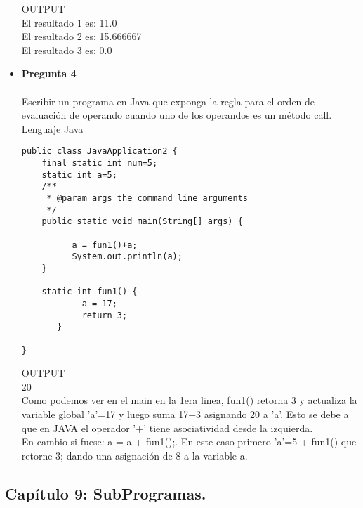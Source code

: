 \documentclass[12pt,oneside]{article}
\begin{document}
\begin{itemize}
OUTPUT\\
El resultado 1 es: 11.0\\
El resultado 2 es: 15.666667\\
El resultado 3 es: 0.0\\


\item {\bf Pregunta 4} \\\\
Escribir un programa en Java que exponga la regla para el orden de evaluación de operando cuando uno de los operandos es un método call.\\
Lenguaje Java\\
\begin{lstlisting}[frame=single]  % Start your code-block
public class JavaApplication2 {
    final static int num=5;
    static int a=5;
    /**
     * @param args the command line arguments
     */
    public static void main(String[] args) {
        
          a = fun1()+a; 
          System.out.println(a); 
    }

    static int fun1() {
            a = 17;
            return 3;
       }

}

\end{lstlisting}
OUTPUT\\
20\\
Como podemos ver en el main en la 1era linea, fun1() retorna 3 y actualiza la variable global 'a'=17 y luego suma 17+3 asignando 20 a 'a'. Esto se debe a que en JAVA el operador '+' tiene asociatividad desde la izquierda.\\
En cambio si fuese:  a = a + fun1();. En este caso primero 'a'=5 + fun1() que retorne 3; dando una asignación de 8 a la variable a.



\end{itemize}


\subsection{Capítulo 9: SubProgramas.}

%

        




\end{document}
